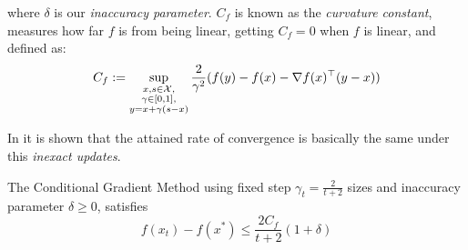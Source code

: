 where $\delta$ is our \emph{inaccuracy parameter}. $C_f$ is known as the \emph{curvature constant}, measures how far $f$ is from being linear, getting $C_f=0$ when $f$ is linear, and defined as:
\begin{equation} \label{eq:curv_const}
C_f := \sup_{ \substack{x,s \in \mathcal{X},\\ \gamma \in [0,1],\\ y=x+\gamma(s-x)} } \frac{2}{\gamma^2} (f(y)-f(x)-\nabla f(x)^\top (y-x))
\end{equation}


In \cite{Jaggi2013} it is shown that the attained rate of convergence is basically the same under this \emph{inexact updates}.

\begin{theorem}
The Conditional Gradient Method using fixed step $\gamma_t=\frac{2}{t+2}$ sizes and inaccuracy parameter $\delta \geq 0$,
satisfies
\begin{equation}
f(x_t)-f(x^*) \leq \frac{2 C_f }{t+2} (1+\delta)
\end{equation}
\end{theorem}
